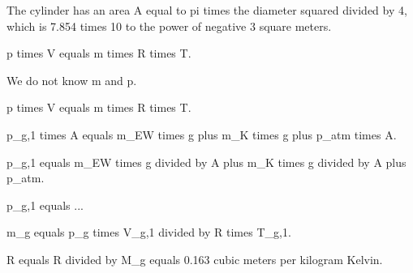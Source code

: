 The cylinder has an area A equal to pi times the diameter squared divided by 4, which is 7.854 times 10 to the power of negative 3 square meters.  

p times V equals m times R times T.  

We do not know m and p.  

p times V equals m times R times T.  

p_g,1 times A equals m_EW times g plus m_K times g plus p_atm times A.  

p_g,1 equals m_EW times g divided by A plus m_K times g divided by A plus p_atm.  

p_g,1 equals ...  

m_g equals p_g times V_g,1 divided by R times T_g,1.  

R equals R divided by M_g equals 0.163 cubic meters per kilogram Kelvin.